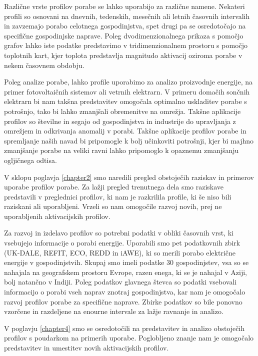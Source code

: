 \begin{sloabstract}
Različne vrste profilov porabe se lahko uporabijo za različne namene. Nekateri profili so osnovani na dnevnih, tedenskih, mesečnih ali letnih časovnih intervalih in zavzemajo porabo celotnega gospodinjstva, spet drugi pa se osredotočajo na specifične gospodinjske naprave. Poleg dvodimenzionalnega prikaza s pomočjo grafov lahko iste podatke predstavimo v tridimenzionalnem prostoru s pomočjo toplotnih kart, kjer toplota predstavlja magnitudo aktivacij oziroma porabe v nekem časovnem obdobju.  

Poleg analize porabe, lahko profile uporabimo za analizo proizvodnje energije, na primer fotovoltaičnih sistemov ali vetrnih elektrarn. V primeru domačih sončnih elektrarn bi nam takšna predstavitev omogočala optimalno uskladitev porabe s potrošnjo, tako bi lahko zmanjšali obremenitve na omrežja. Takšne aplikacije profilov so številne in segajo od gospodinjstva in industrije do upravljanja z omrežjem in odkrivanja anomalij v porabi. Takšne aplikacije profilov porabe in spremljanje naših navad bi pripomogle k bolj učinkoviti potrošnji, kjer bi majhno zmanjšanje porabe na veliki ravni lahko pripomoglo k opaznemu zmanjšanju ogljičnega odtisa. 

V sklopu poglavja \ref{chapter2} smo naredili pregled obstoječih raziskav in primerov uporabe profilov porabe. Za lažji pregled trenutnega dela smo raziskave predstavili v preglednici profilov, ki nam je razkrilila profile, ki še niso bili raziskani ali uporabljeni. Vrzeli so nam omogočile razvoj novih, prej ne uporabljenih aktivacijskih profilov.  

Za razvoj in izdelavo profilov so potrebni podatki v obliki časovnih vrst, ki vsebujejo informacije o porabi energije. Uporabili smo pet podatkovnih zbirk (UK-DALE, REFIT, ECO, REDD in iAWE), ki so merili porabo električne energije v gospodinjstvih. Skupaj smo imeli podatke 30 gospodinjstev, vsa so se nahajala na geografskem prostoru Evrope, razen enega, ki se je nahajal v Aziji, bolj natančno v Indiji.  
Poleg podatkov glavnega števca so podatki vsebovali informacijo o porabi vseh naprav znotraj gospodinjstva, kar nam je omogočalo razvoj profilov porabe za specifične naprave. Zbirke podatkov so bile ponovno vzorčene in razdeljene na enourne intervale za lažje ravnanje in analizo.  

V poglavju \ref{chapter4} smo se osredotočili na predstavitev in analizo obstoječih profilov s poudarkom na primerih uporabe. Poglobljeno znanje nam je omogočalo predstavitev in umestitev novih aktivacijskih profilov.  


\end{sloabstract}

